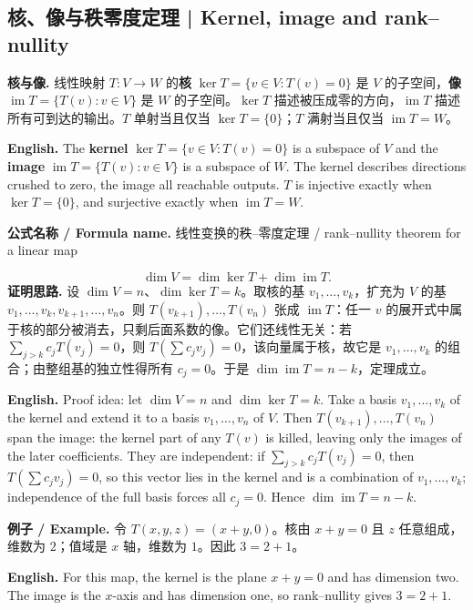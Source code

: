 \documentclass[UTF8,11pt,a4paper]{ctexart}
\newcommand{\EN}[1]{\par\noindent\textbf{English.} #1\par}
\newcommand{\FORMULA}[2]{\par\noindent\textbf{公式名称 / Formula name.} #1 / #2\par}
\newcommand{\EX}[2]{\par\noindent\textbf{例子 / Example.} #1\par\EN{#2}}
\begin{document}
\subsection{核、像与秩零度定理 | Kernel, image and rank--nullity}
\noindent\textbf{核与像.} 线性映射 $T:V\to W$ 的\textbf{核} $\ker T=\{v\in V:T(v)=0\}$ 是 $V$ 的子空间，\textbf{像} $\operatorname{im}T=\{T(v):v\in V\}$ 是 $W$ 的子空间。$\ker T$ 描述被压成零的方向，$\operatorname{im}T$ 描述所有可到达的输出。$T$ 单射当且仅当 $\ker T=\{0\}$；$T$ 满射当且仅当 $\operatorname{im}T=W$。
\EN{The \textbf{kernel} $\ker T=\{v\in V:T(v)=0\}$ is a subspace of $V$ and the \textbf{image} $\operatorname{im}T=\{T(v):v\in V\}$ is a subspace of $W$. The kernel describes directions crushed to zero, the image all reachable outputs. $T$ is injective exactly when $\ker T=\{0\}$, and surjective exactly when $\operatorname{im}T=W$.}
\FORMULA{线性变换的秩--零度定理}{rank--nullity theorem for a linear map}
\[
\dim V=\dim\ker T+\dim\operatorname{im}T.
\]
\noindent\textbf{证明思路.} 设 $\dim V=n$、$\dim\ker T=k$。取核的基 $v_1,\dots,v_k$，扩充为 $V$ 的基 $v_1,\dots,v_k,v_{k+1},\dots,v_n$。则 $T(v_{k+1}),\dots,T(v_n)$ 张成 $\operatorname{im}T$：任一 $v$ 的展开式中属于核的部分被消去，只剩后面系数的像。它们还线性无关：若 $\sum_{j>k}c_jT(v_j)=0$，则 $T(\sum c_jv_j)=0$，该向量属于核，故它是 $v_1,\dots,v_k$ 的组合；由整组基的独立性得所有 $c_j=0$。于是 $\dim\operatorname{im}T=n-k$，定理成立。
\EN{Proof idea: let $\dim V=n$ and $\dim\ker T=k$. Take a basis $v_1,\dots,v_k$ of the kernel and extend it to a basis $v_1,\dots,v_n$ of $V$. Then $T(v_{k+1}),\dots,T(v_n)$ span the image: the kernel part of any $T(v)$ is killed, leaving only the images of the later coefficients. They are independent: if $\sum_{j>k}c_jT(v_j)=0$, then $T(\sum c_jv_j)=0$, so this vector lies in the kernel and is a combination of $v_1,\dots,v_k$; independence of the full basis forces all $c_j=0$. Hence $\dim\operatorname{im}T=n-k$.}
\EX{令 $T(x,y,z)=(x+y,0)$。核由 $x+y=0$ 且 $z$ 任意组成，维数为 $2$；值域是 $x$ 轴，维数为 $1$。因此 $3=2+1$。}{For this map, the kernel is the plane $x+y=0$ and has dimension two. The image is the $x$-axis and has dimension one, so rank--nullity gives $3=2+1$.}
\end{document}
